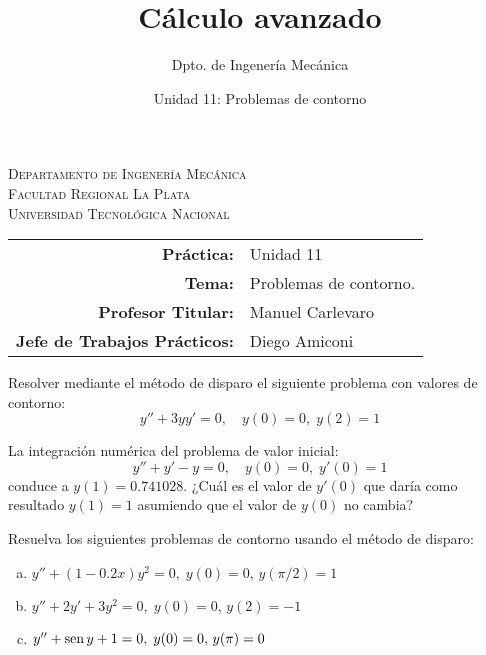 \documentclass[11pt]{article}
\title{Cálculo avanzado}
\author{Dpto. de Ingenería Mecánica}
\date{Unidad 11: Problemas de contorno}
\begin{document}

\begin{center}
\end{center} 

\begin{center}
\vspace{\baselineskip}
\Large{\textsc{Departamento de Ingenería Mecánica}} \\
\textsc{Facultad Regional La Plata} \\
\textsc{Universidad Tecnológica Nacional}
\end{center}


\begin{center}
\begin{tabular}{r l}
    \textbf{Práctica:} & Unidad 11 \\
 \textbf{Tema:} & Problemas de contorno. \\
 \textbf{Profesor Titular:} & Manuel Carlevaro \\
 \textbf{Jefe de Trabajos Prácticos:} & Diego Amiconi \\
\end{tabular}\end{center}

\vspace{1em}

\begin{question} %
Resolver mediante el método de disparo el siguiente problema con valores de contorno:
\[ y'' + 3 y y' = 0, \quad y(0) = 0, \; y(2) = 1 \]
\end{question}

\begin{question} %
La integración numérica del problema de valor inicial:
\[ y'' + y' -y = 0, \quad y(0) = 0, \; y'(0) = 1 \]
conduce a $y(1) = 0.741028$. ¿Cuál es el valor de $y'(0)$ que daría como resultado $y(1) = 1$ asumiendo que el valor de $y(0)$ no cambia?
\end{question}

\begin{question} %
Resuelva los siguientes problemas de contorno usando el método de disparo:
\begin{enumerate}[a)]
    \item $y'' + (1 - 0.2 x) y^2 = 0, \; y(0) = 0, \, y(\pi/2) = 1$
    \item $y'' + 2 y' + 3 y^2 = 0, \; y(0) = 0, \, y(2) = -1$
    \item $y'' + \operatorname{sen} y + 1 = 0, \; y(0) = 0, \, y(\pi) = 0$
\end{enumerate}
\end{question}
\end{document}
